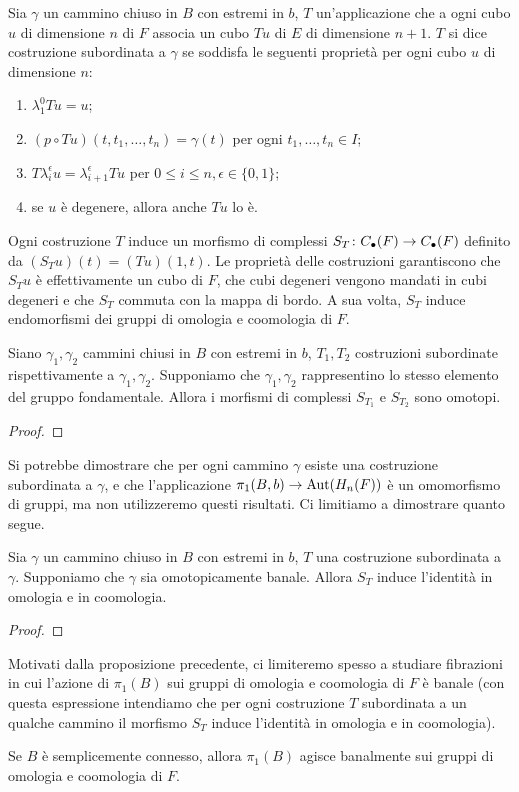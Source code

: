 \begin{definition}
Sia $\gamma$ un cammino chiuso in $B$ con estremi in $b$, $T$ un'applicazione che a ogni cubo $u$ di dimensione $n$ di $F$ associa un cubo $Tu$ di $E$ di dimensione $n+1$. $T$ si dice costruzione subordinata a $\gamma$ se soddisfa le seguenti proprietà per ogni cubo $u$ di dimensione $n$:
\begin{enumerate}
\item $\lambda^0_1 Tu=u$;
\item $(p\circ Tu)(t,t_1,\ldots,t_n)=\gamma(t)$ per ogni $t_1,\ldots,t_n\in I$;
\item $T\lambda^\epsilon_iu=\lambda^\epsilon_{i+1}Tu$ per $0\le i\le n,\epsilon\in\{0,1\}$;
\item se $u$ è degenere, allora anche $Tu$ lo è.
\end{enumerate}
\end{definition}
Ogni costruzione $T$ induce un morfismo di complessi $S_T\colon C_\bullet(F)\to C_\bullet(F)$ definito da $(S_Tu)(t)=(Tu)(1,t)$. Le proprietà delle costruzioni garantiscono che $S_Tu$ è effettivamente un cubo di $F$, che cubi degeneri vengono mandati in cubi degeneri e che $S_T$ commuta con la mappa di bordo. A sua volta, $S_T$ induce endomorfismi dei gruppi di omologia e coomologia di $F$.
\begin{proposition}
Siano $\gamma_1,\gamma_2$ cammini chiusi in $B$ con estremi in $b$, $T_1,T_2$ costruzioni subordinate rispettivamente a $\gamma_1,\gamma_2$. Supponiamo che $\gamma_1,\gamma_2$ rappresentino lo stesso elemento del gruppo fondamentale. Allora i morfismi di complessi $S_{T_1}$ e $S_{T_2}$ sono omotopi.
\end{proposition}
\begin{proof}

\end{proof}
Si potrebbe dimostrare che per ogni cammino $\gamma$ esiste una costruzione subordinata a $\gamma$, e che l'applicazione $\pi_1(B,b)\to\operatorname{Aut}(H_n(F))$ è un omomorfismo di gruppi, ma non utilizzeremo questi risultati.  
Ci limitiamo a dimostrare quanto segue.
\begin{proposition}
Sia $\gamma$ un cammino chiuso in $B$ con estremi in $b$, $T$ una costruzione subordinata a $\gamma$. Supponiamo che $\gamma$ sia omotopicamente banale. Allora $S_T$ induce l'identità in omologia e in coomologia.
\end{proposition}
\begin{proof}

\end{proof}
Motivati dalla proposizione precedente, ci limiteremo spesso a studiare fibrazioni in cui l'azione di $\pi_1(B)$ sui gruppi di omologia e coomologia di $F$ è banale (con questa espressione intendiamo che per ogni costruzione $T$ subordinata a un qualche cammino il morfismo $S_T$ induce l'identità in omologia e in coomologia).
\begin{corollary}
Se $B$ è semplicemente connesso, allora $\pi_1(B)$ agisce banalmente sui gruppi di omologia e coomologia di $F$.
\end{corollary}

